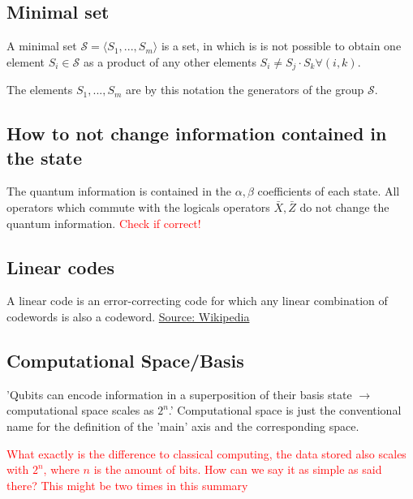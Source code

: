 \subsection{Minimal set}\label{sec:basic.math.minimal_set}

A minimal set $\mathcal{S}= \langle S_1,...,S_m\rangle$ is a set, 
in which is is not possible to obtain one element $S_i \in \mathcal{S}$ 
as a product of any other elements  $S_i \ne S_j \cdot S_k \forall (i,k)$. \cite{QECintro}

The elements $S_1, ..., S_m$ are by this notation the generators of the group $\mathcal{S}$.



\subsection{How to not change information contained in the state}
The quantum information is contained in the $\alpha,\beta$ coefficients of each state.
All operators which commute with the logicals operators $\bar{X},\bar{Z}$ do not change the quantum information. \cite{QECmemory}
\textcolor{red}{Check if correct!}


\subsection{Linear codes}\label{sec:basic.math.linear_codes}
A linear code is an error-correcting code for which any linear combination of codewords is also a codeword. \href{https://en.wikipedia.org/wiki/Linear_code}{Source: Wikipedia} 


\subsection{Computational Space/Basis}
'Qubits can encode information in a superposition of their basis state $\rightarrow$ computational space scales as $2^n$.' \cite{QECintro}
Computational space is just the conventional name for the definition of the 'main' axis and the corresponding space.

\textcolor{red}{What exactly is the difference to classical computing, the data stored also scales with $2^n$, where $n$ is the amount of bits.
How can we say it as simple as said there?
This might be two times in this summary
}